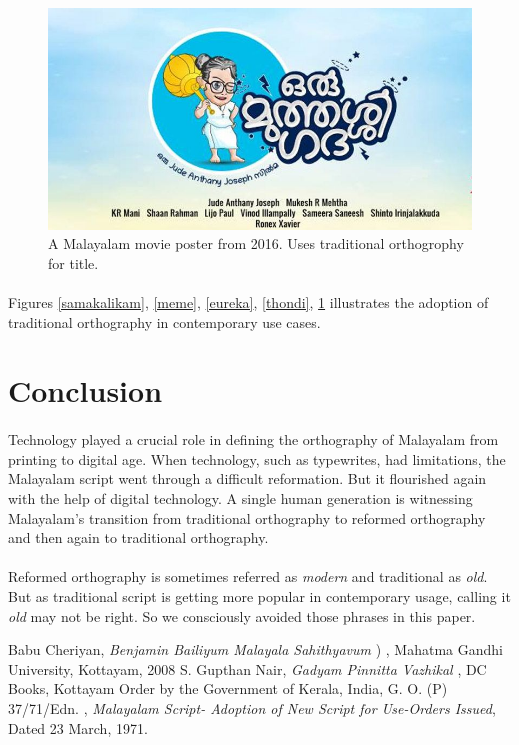 \documentclass[10pt]{article}
\begin{document}
\begin{figure}[H]
 \centering
  \includegraphics[scale=0.4]{images/2016-oru-muthashi-gadha}
 \caption{A Malayalam movie poster from 2016. Uses traditional orthogrophy for title.}
 \label{muthassi}
\end{figure}

\paragraph{}Figures \ref{samakalikam}, \ref{meme}, \ref{eureka}, \ref{thondi}, \ref{muthassi} illustrates the adoption of traditional orthography in contemporary use cases.

\section{Conclusion}
\paragraph{}
Technology played a crucial role in defining the orthography of Malayalam from printing to digital age. When technology, such as typewrites, had limitations, the Malayalam script went through a difficult reformation. But it flourished again with the help of digital technology. A single human generation is witnessing Malayalam's transition from traditional orthography to reformed orthography and then again to traditional orthography. 
\paragraph{}
Reformed orthography is sometimes referred as \textit{modern} and traditional as \textit{old}. But as traditional script is getting more popular in contemporary usage, calling it \textit{old} may not be right. So we consciously avoided those phrases in this paper.

\begin{thebibliography}{9}

 Babu Cheriyan, \textit{Benjamin Bailiyum Malayala Sahithyavum} {) }, Mahatma Gandhi University, Kottayam, 2008
 S. Gupthan Nair, \textit{Gadyam Pinnitta Vazhikal}{ }, DC Books, Kottayam
 Order by the Government of Kerala, India, G. O. (P) 37/71/Edn. , \textit{Malayalam Script- Adoption of New Script for Use-Orders Issued}, Dated 23 March, 1971.

\end{thebibliography}
\end{document}
